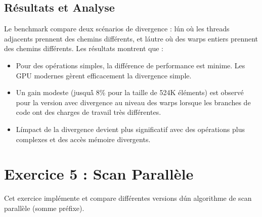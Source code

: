 \documentclass[a4paper,11pt]{article}
\begin{document}
\subsection{Résultats et Analyse}
Le benchmark compare deux scénarios de divergence : l\'un où les threads adjacents prennent des chemins différents, et l\'autre où des warps entiers prennent des chemins différents. Les résultats montrent que :
\begin{itemize}
    \item Pour des opérations simples, la différence de performance est minime. Les GPU modernes gèrent efficacement la divergence simple.
    \item Un gain modeste (jusqu\'à 8\% pour la taille de 524K éléments) est observé pour la version avec divergence au niveau des warps lorsque les branches de code ont des charges de travail très différentes.
    \item L\'impact de la divergence devient plus significatif avec des opérations plus complexes et des accès mémoire divergents.
\end{itemize}

\section{Exercice 5 : Scan Parallèle}
Cet exercice implémente et compare différentes versions d\'un algorithme de scan parallèle (somme préfixe).
\end{document}
